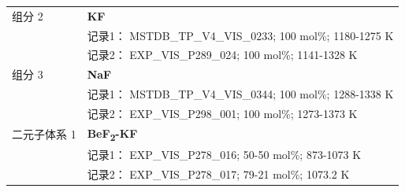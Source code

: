 \documentclass[12pt]{article}
\begin{document}
{\begin{longtable}[]{@{}
  >{\raggedright\arraybackslash}p{}
  >{\raggedright\arraybackslash}p{}@{}}
组分 2  & \textbf{KF} \\
 & 记录1： MSTDB\_TP\_V4\_VIS\_0233; 100 mol\%; 1180-1275 K \\
 & 记录2： EXP\_VIS\_P289\_024; 100 mol\%; 1141-1328 K  \\

组分 3  & \textbf{NaF} \\
 & 记录1： MSTDB\_TP\_V4\_VIS\_0344; 100 mol\%; 1288-1338 K \\
 & 记录2： EXP\_VIS\_P298\_001; 100 mol\%; 1273-1373 K  \\

二元子体系 1  & \textbf{BeF\textsubscript{2}-KF} \\
 & 记录1： EXP\_VIS\_P278\_016; 50-50 mol\%; 873-1073 K \\
 & 记录2： EXP\_VIS\_P278\_017; 79-21 mol\%; 1073.2 K  \\


\end{longtable}}
\end{document}
